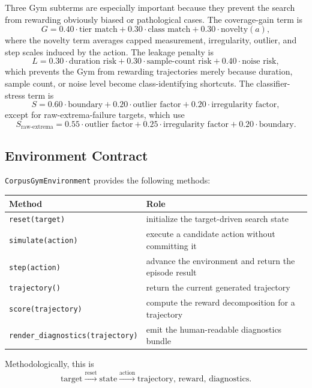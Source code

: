 \documentclass[11pt]{article}
\begin{document}
Three Gym subterms are especially important because they prevent the search from
rewarding obviously biased or pathological cases. The coverage-gain term is
\begin{equation}
    G
    =
    0.40 \cdot \text{tier match}
    + 0.30 \cdot \text{class match}
    + 0.30 \cdot \text{novelty}(a),
\end{equation}
where the novelty term averages capped measurement, irregularity, outlier, and
step scales induced by the action. The leakage penalty is
\begin{equation}
    L
    =
    0.30 \cdot \text{duration risk}
    + 0.30 \cdot \text{sample-count risk}
    + 0.40 \cdot \text{noise risk},
\end{equation}
which prevents the Gym from rewarding trajectories merely because duration,
sample count, or noise level become class-identifying shortcuts. The
classifier-stress term is
\begin{equation}
    S
    =
    0.60 \cdot \text{boundary}
    + 0.20 \cdot \text{outlier factor}
    + 0.20 \cdot \text{irregularity factor},
\end{equation}
except for raw-extrema-failure targets, which use
\begin{equation}
    S_{\text{raw-extrema}}
    =
    0.55 \cdot \text{outlier factor}
    + 0.25 \cdot \text{irregularity factor}
    + 0.20 \cdot \text{boundary}.
\end{equation}

\subsection*{Environment Contract}

\texttt{CorpusGymEnvironment} provides the following methods:
\begin{center}
\small
\begin{tabularx}{0.92\textwidth}{lX}
\toprule
Method & Role \\
\midrule
\texttt{reset(target)} & initialize the target-driven search state \\
\texttt{simulate(action)} & execute a candidate action without committing it \\
\texttt{step(action)} & advance the environment and return the episode result \\
\texttt{trajectory()} & return the current generated trajectory \\
\texttt{score(trajectory)} & compute the reward decomposition for a trajectory \\
\texttt{render\_diagnostics(trajectory)} & emit the human-readable diagnostics bundle \\
\bottomrule
\end{tabularx}
\end{center}
Methodologically, this is
\begin{equation}
    \text{target}
    \xrightarrow{\text{reset}}
    \text{state}
    \xrightarrow{\text{action}}
    \text{trajectory, reward, diagnostics}.
\end{equation}
\end{document}
